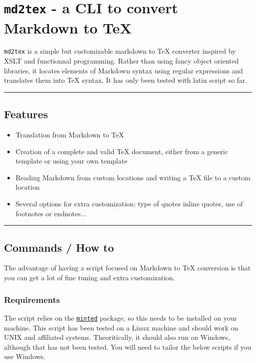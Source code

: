 \section{\texttt{md2tex} - a CLI to convert Markdown to TeX}

\texttt{md2tex} is a simple but customizable markdown to TeX converter inspired by XSLT and functionnal programming. 
Rather than using fancy object oriented libraries, it locates elements of Markdown syntax using regular 
expressions and translates them into TeX syntax. It has only been tested with latin script so far.

\par\noindent\rule{\linewidth}{0.4pt}
\subsection{Features}

\begin{itemize}
\item Translation from Markdown to TeX
\item Creation of a complete and valid TeX document, either from a generic template or using your own template
\item Reading Markdown from custom locations and writing a TeX file to a custom location
\item Several options for extra customization: type of quotes inline quotes, use of footnotes or endnotes... 
\end{itemize}

\par\noindent\rule{\linewidth}{0.4pt}
\subsection{Commands / How to}

The advantage of having a script focused on Markdown to TeX conversion is that you can get a lot of fine tuning
and extra customization.
\subsubsection{Requirements}

The script relies on the \href{http://tug.ctan.org/macros/latex/contrib/minted/minted.pdf}{\texttt{minted}} package,
so this needs to be installed on your machine. This script has been tested on a Linux machine and should
work on UNIX and affiliated systems. Theoritically, it should also run on Windows, although that has not
been tested. You will need to tailor the below scripts if you use Windows.
